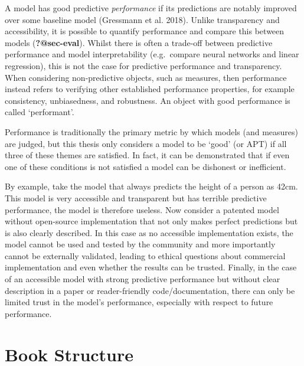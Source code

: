 \documentclass[
  letterpaper,
]{scrbook}
\theoremstyle{plain}
\theoremstyle{definition}
\theoremstyle{remark}
\begin{document}
A model has good predictive \emph{performance} if its predictions are
notably improved over some baseline model (Gressmann et al. 2018).
Unlike transparency and accessibility, it is possible to quantify
performance and compare this between models (\textbf{?@sec-eval}).
Whilst there is often a trade-off between predictive performance and
model interpretability (e.g.~compare neural networks and linear
regression), this is not the case for predictive performance and
transparency. When considering non-predictive objects, such as measures,
then performance instead refers to verifying other established
performance properties, for example consistency, unbiasedness, and
robustness. An object with good performance is called `performant'.

Performance is traditionally the primary metric by which models (and
measures) are judged, but this thesis only considers a model to be
`good' (or APT) if all three of these themes are satisfied. In fact, it
can be demonstrated that if even one of these conditions is not
satisfied a model can be dishonest or inefficient.

By example, take the model that always predicts the height of a person
as 42cm. This model is very accessible and transparent but has terrible
predictive performance, the model is therefore useless. Now consider a
patented model without open-source implementation that not only makes
perfect predictions but is also clearly described. In this case as no
accessible implementation exists, the model cannot be used and tested by
the community and more importantly cannot be externally validated,
leading to ethical questions about commercial implementation and even
whether the results can be trusted. Finally, in the case of an
accessible model with strong predictive performance but without clear
description in a paper or reader-friendly code/documentation, there can
only be limited trust in the model's performance, especially with
respect to future performance.

\hypertarget{sec-intro-structure}{%
\section{Book Structure}\label{sec-intro-structure}}
\end{document}

